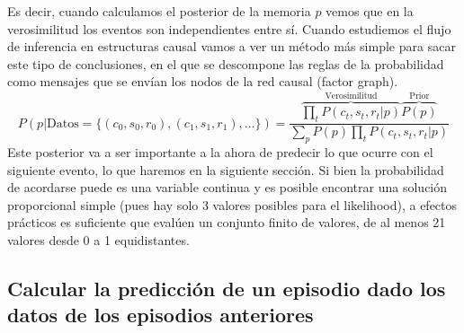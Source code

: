 \documentclass[a4paper,10pt]{article}
\begin{document}
%
Es decir, cuando calculamos el posterior de la memoria $p$ vemos que en la verosimilitud los eventos son independientes entre sí.
%
Cuando estudiemos el flujo de inferencia en estructuras causal vamos a ver un método más simple para sacar este tipo de conclusiones, en el que se descompone las reglas de la probabilidad como mensajes que se envían los nodos de la red causal (factor graph).
%
\begin{equation}
P(p|\text{Datos} = \{(c_0,s_0,r_0),(c_1,s_1,r_1),\dots \}) = \frac{\overbrace{\prod_t P(c_t,s_t,r_t|p)}^{\text{Verosimilitud}} \overbrace{P(p)}^{\text{Prior}}}{ \sum_p P(p) \prod_t P(c_t,s_t,r_t|p)}
\end{equation}
%
Este posterior va a ser importante a la ahora de predecir lo que ocurre con el siguiente evento, lo que haremos en la siguiente sección.
%
Si bien la probabilidad de acordarse puede es una variable continua y es posible encontrar una solución proporcional simple (pues hay solo 3 valores posibles para el likelihood), a efectos prácticos es suficiente que evalúen un conjunto finito de valores, de al menos 21 valores desde 0 a 1 equidistantes.


\subsection{Calcular la predicción de un episodio dado los datos de los episodios anteriores}
\end{document}
